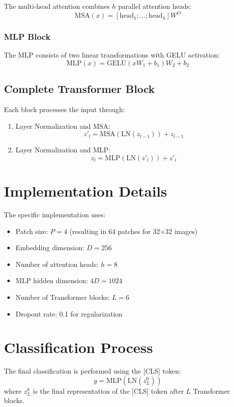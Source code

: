 \documentclass{article}
\begin{document}
The multi-head attention combines $h$ parallel attention heads:
\begin{equation}
    \text{MSA}(x) = [\text{head}_1; ...; \text{head}_h]W^O
\end{equation}

\subsubsection{MLP Block}
The MLP consists of two linear transformations with GELU activation:
\begin{equation}
    \text{MLP}(x) = \text{GELU}(xW_1 + b_1)W_2 + b_2
\end{equation}

\subsection{Complete Transformer Block}
Each block processes the input through:
\begin{enumerate}
    \item Layer Normalization and MSA:
    \begin{equation}
        z'_l = \text{MSA}(\text{LN}(z_{l-1})) + z_{l-1}
    \end{equation}
    
    \item Layer Normalization and MLP:
    \begin{equation}
        z_l = \text{MLP}(\text{LN}(z'_l)) + z'_l
    \end{equation}
\end{enumerate}

\section{Implementation Details}
The specific implementation uses:
\begin{itemize}
    \item Patch size: $P = 4$ (resulting in 64 patches for 32×32 images)
    \item Embedding dimension: $D = 256$
    \item Number of attention heads: $h = 8$
    \item MLP hidden dimension: $4D = 1024$
    \item Number of Transformer blocks: $L = 6$
    \item Dropout rate: 0.1 for regularization
\end{itemize}

\section{Classification Process}
The final classification is performed using the [CLS] token:
\begin{equation}
    y = \text{MLP}(\text{LN}(z_L^0))
\end{equation}
where $z_L^0$ is the final representation of the [CLS] token after $L$ Transformer blocks.
\end{document}
